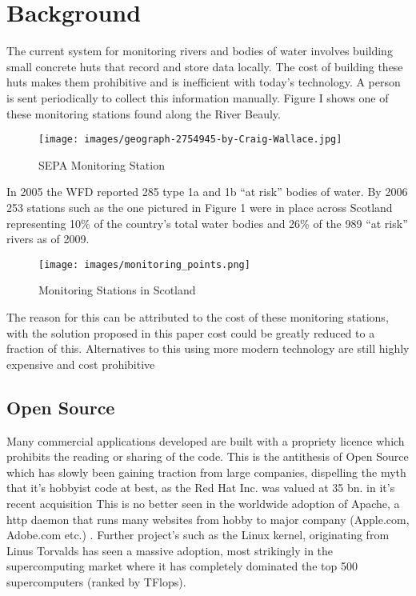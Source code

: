 \section{Background}
The current system for monitoring rivers and bodies of water involves building small concrete huts that record and store data locally. The cost of building these huts makes them prohibitive and is inefficient with today's technology. A person is sent periodically to collect this information manually. Figure I shows one of these monitoring stations found along the River Beauly. 
\begin{figure}[H]
	\centering
	\texttt{[image: images/geograph-2754945-by-Craig-Wallace.jpg]}
	\caption{ SEPA Monitoring Station \citep{Wallace2012}}
	\label{fig:monStation}
\end{figure}
In 2005 the WFD reported 285 type 1a and 1b “at risk” bodies of water. \citep{SEPA2007} By 2006  253 stations such as the one pictured in Figure 1 were in place across Scotland representing 10\% of the country’s total water bodies and 26\% of the 989  “at risk” rivers as of 2009. \citep{SEPA2009}
\begin{figure}[H]
	\centering
	\texttt{[image: images/monitoring\_points.png]}
	\caption{ Monitoring Stations in Scotland \citep{SEPA2006}}
	\label{fig:monStation}
\end{figure}
The reason for this can be attributed to the cost of these monitoring stations, with the solution proposed in this paper cost could be greatly reduced to a fraction of this. \citep{SEPA2016} Alternatives to this using more modern technology are still highly expensive and cost prohibitive \citep{TheIoTMarketplace2015}

\subsection{Open Source}

Many commercial applications developed are built with a propriety licence which prohibits the reading or sharing of the code. This is the antithesis of Open Source which has slowly been gaining traction from large companies, dispelling the myth that it's hobbyist code at best, as the Red Hat Inc. was valued at 35 bn. in it's recent acquisition \citep{Hammond2018} This is no better seen in the worldwide adoption of Apache, a http daemon that runs many websites from hobby to major company (Apple.com, Adobe.com etc.) \citep{W3techs2018}. Further project's such as the Linux kernel, originating from Linus Torvalds has seen a massive adoption, most strikingly in the supercomputing market where it has completely dominated the top 500 supercomputers (ranked by TFlops). \citep{Top5002018}

